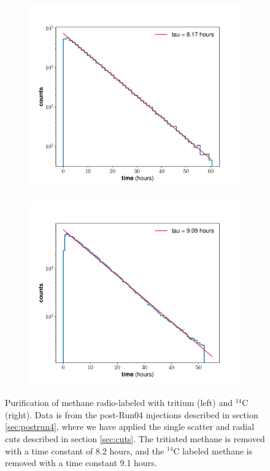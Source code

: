 \begin{figure}[h!]
\centering
\begin{subfigure}{0.5\textwidth}
  \centering
  \includegraphics[width=\textwidth]{Figures/H3_removal_time.pdf}
\end{subfigure}%
\begin{subfigure}{0.5\textwidth}
  \centering
  \includegraphics[width=\textwidth]{Figures/C14_removal_time.pdf}
\end{subfigure}
\caption{Purification of methane radio-labeled with tritium (left) and $^{14}$C (right). Data is from the post-Run04 injections described in section \ref{sec:postrun4}, where we have applied the single scatter and radial cuts described in section \ref{sec:cuts}. The tritiated methane is removed with a time constant of 8.2 hours, and the $^{14}$C labeled methane is removed with a time constant 9.1 hours. }
\label{fig:removaltime}
\end{figure}


